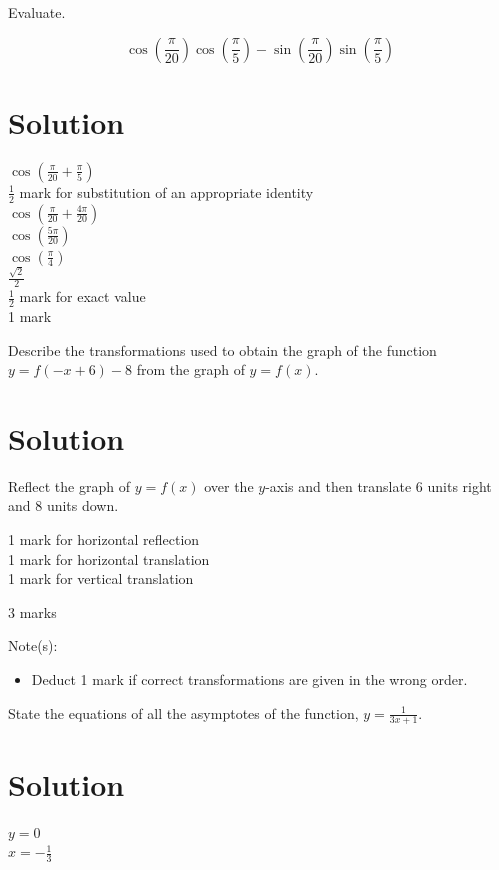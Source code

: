 \documentclass[10pt]{article}
\begin{document}
Evaluate.

$$
\cos \left(\frac{\pi}{20}\right) \cos \left(\frac{\pi}{5}\right)-\sin \left(\frac{\pi}{20}\right) \sin \left(\frac{\pi}{5}\right)
$$

\section*{Solution}
$\cos \left(\frac{\pi}{20}+\frac{\pi}{5}\right)$\\
$\frac{1}{2}$ mark for substitution of an appropriate identity\\
$\cos \left(\frac{\pi}{20}+\frac{4 \pi}{20}\right)$\\
$\cos \left(\frac{5 \pi}{20}\right)$\\
$\cos \left(\frac{\pi}{4}\right)$\\
$\frac{\sqrt{2}}{2}$\\
$\frac{1}{2}$ mark for exact value\\
1 mark

Describe the transformations used to obtain the graph of the function $y=f(-x+6)-8$ from the graph of $y=f(x)$.

\section*{Solution}
Reflect the graph of $y=f(x)$ over the $y$-axis and then translate 6 units right and 8 units down.

\begin{displayquote}
1 mark for horizontal reflection\\
1 mark for horizontal translation\\
1 mark for vertical translation
\end{displayquote}

3 marks

Note(s):

\begin{itemize}
  \item Deduct 1 mark if correct transformations are given in the wrong order.
\end{itemize}

State the equations of all the asymptotes of the function, $y=\frac{1}{3 x+1}$.

\section*{Solution}
$y=0$\\
$x=-\frac{1}{3}$
\end{document}
